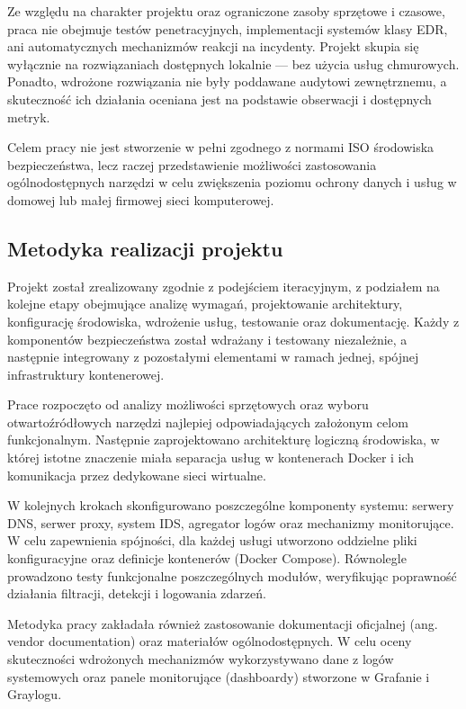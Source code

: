 \documentclass[
    left=2.5cm,         %
    right=2.5cm,        %
    top=2.5cm,          %
    bottom=3cm,         %
    bindingoffset=6mm,  %
    nohyphenation=true %
]{eiti/eiti-thesis} %
\begin{document}
Ze względu na charakter projektu oraz ograniczone zasoby sprzętowe i czasowe, praca nie obejmuje testów penetracyjnych, implementacji systemów klasy EDR, ani automatycznych mechanizmów reakcji na incydenty. Projekt skupia się wyłącznie na rozwiązaniach dostępnych lokalnie — bez użycia usług chmurowych. Ponadto, wdrożone rozwiązania nie były poddawane audytowi zewnętrznemu, a skuteczność ich działania oceniana jest na podstawie obserwacji i dostępnych metryk.

Celem pracy nie jest stworzenie w pełni zgodnego z normami ISO środowiska bezpieczeństwa, lecz raczej przedstawienie możliwości zastosowania ogólnodostępnych narzędzi w celu zwiększenia poziomu ochrony danych i usług w domowej lub małej firmowej sieci komputerowej.

\subsection{Metodyka realizacji projektu}

Projekt został zrealizowany zgodnie z podejściem iteracyjnym, z podziałem na kolejne etapy obejmujące analizę wymagań, projektowanie architektury, konfigurację środowiska, wdrożenie usług, testowanie oraz dokumentację. Każdy z komponentów bezpieczeństwa został wdrażany i testowany niezależnie, a następnie integrowany z pozostałymi elementami w ramach jednej, spójnej infrastruktury kontenerowej.

Prace rozpoczęto od analizy możliwości sprzętowych oraz wyboru otwartoźródłowych narzędzi najlepiej odpowiadających założonym celom funkcjonalnym. Następnie zaprojektowano architekturę logiczną środowiska, w której istotne znaczenie miała separacja usług w kontenerach Docker i ich komunikacja przez dedykowane sieci wirtualne.

W kolejnych krokach skonfigurowano poszczególne komponenty systemu: serwery DNS, serwer proxy, system IDS, agregator logów oraz mechanizmy monitorujące. W celu zapewnienia spójności, dla każdej usługi utworzono oddzielne pliki konfiguracyjne oraz definicje kontenerów (Docker Compose). Równolegle prowadzono testy funkcjonalne poszczególnych modułów, weryfikując poprawność działania filtracji, detekcji i logowania zdarzeń.

Metodyka pracy zakładała również zastosowanie dokumentacji oficjalnej (ang. vendor documentation) oraz materiałów ogólnodostępnych. W celu oceny skuteczności wdrożonych mechanizmów wykorzystywano dane z logów systemowych oraz panele monitorujące (dashboardy) stworzone w Grafanie i Graylogu.
\end{document}
